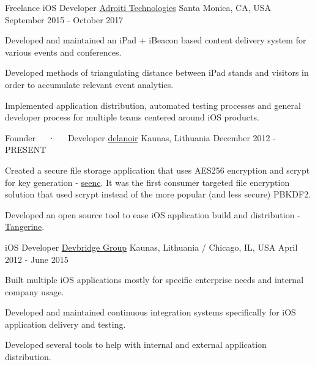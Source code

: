 \begin{cventries}
  \cventry
    {Freelance iOS Developer} %
    {\href{https://www.adroiti.com}{Adroiti Technologies}} %
    {Santa Monica, CA, USA} %
    {September 2015 - October 2017} %
    {
       \begin{cvitems} %
         \item {Developed and maintained an iPad + iBeacon based content delivery system for various events and conferences.}
         \item {Developed methods of triangulating distance between iPad stands and visitors in order to accumulate relevant event analytics.}
         \item {Implemented application distribution, automated testing processes and general developer process for multiple teams centered around iOS products.}
       \end{cvitems}
    }

  \cventry
    {Founder~~~·~~~Developer} %
    {\href{https://delanoir.com}{delanoir}} %
    {Kaunas, Lithuania} %
    {December 2012 - PRESENT} %
    {
      \begin{cvitems} %
        \item {Created a secure file storage application that uses AES256 encryption and scrypt for key generation - \href{http://appstore.com/seenc}{seenc}. It was the first consumer targeted file encryption solution that used scrypt instead of the more popular (and less secure) PBKDF2.}
        \item {Developed an open source tool to ease iOS application build and distribution - \href{http://github.com/karstx/tangerine}{Tangerine}.}
      \end{cvitems}
    }

  \cventry
    {iOS Developer} %
    {\href{https://devbridge.com}{Devbridge Group}} %
    {Kaunas, Lithuania / Chicago, IL, USA} %
    {April 2012 - June 2015} %
    {
      \begin{cvitems} %
        \item {Built multiple iOS applications mostly for specific enterprise needs and internal company usage.}
        \item {Developed and maintained continuous integration systems specifically for iOS application delivery and testing.}
        \item {Developed several tools to help with internal and external application distribution.}
      \end{cvitems}
    }


\end{cventries}
